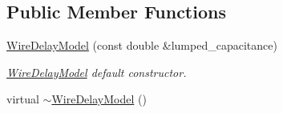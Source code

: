 \subsection*{Public Member Functions}
\begin{DoxyCompactItemize}
\item 
\hyperlink{classWireDelayModel_a0fd2defb581f6d8bcd67e5c935387d95}{Wire\-Delay\-Model} (const double \&lumped\-\_\-capacitance)
\begin{DoxyCompactList}\small\item\em \hyperlink{classWireDelayModel}{Wire\-Delay\-Model} default constructor. \end{DoxyCompactList}\item 
\hypertarget{classWireDelayModel_ad9103d46909b96ad4015c818dcd2988c}{virtual \hyperlink{classWireDelayModel_ad9103d46909b96ad4015c818dcd2988c}{$\sim$\-Wire\-Delay\-Model} ()}\label{classWireDelayModel_ad9103d46909b96ad4015c818dcd2988c}


\end{DoxyCompactItemize}
